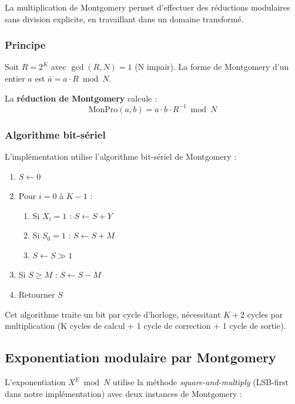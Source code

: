 \documentclass[12pt,a4paper]{report}
\begin{document}
La multiplication de Montgomery permet d'effectuer des réductions modulaires
sans division explicite, en travaillant dans un domaine transformé.

\subsubsection{Principe}
Soit $R = 2^K$ avec $\gcd(R, N) = 1$ (N impair). La forme de Montgomery
d'un entier $a$ est $\bar{a} = a \cdot R \bmod N$.

La \textbf{réduction de Montgomery} calcule :
\[
  \text{MonPro}(a, b) = a \cdot b \cdot R^{-1} \bmod N
\]

\subsubsection{Algorithme bit-sériel}
L'implémentation utilise l'algorithme bit-sériel de Montgomery :
\begin{enumerate}
  \item $S \leftarrow 0$
  \item Pour $i = 0$ à $K-1$ :
  \begin{enumerate}
    \item Si $X_i = 1$ : $S \leftarrow S + Y$
    \item Si $S_0 = 1$ : $S \leftarrow S + M$
    \item $S \leftarrow S \gg 1$
  \end{enumerate}
  \item Si $S \geq M$ : $S \leftarrow S - M$
  \item Retourner $S$
\end{enumerate}

Cet algorithme traite un bit par cycle d'horloge, nécessitant $K+2$
cycles par multiplication (K cycles de calcul + 1 cycle de correction
+ 1 cycle de sortie).


\subsection{Exponentiation modulaire par Montgomery}

L'exponentiation $X^E \bmod N$ utilise la méthode \textit{square-and-multiply}
(LSB-first dans notre implémentation) avec deux instances de Montgomery :
\end{document}
